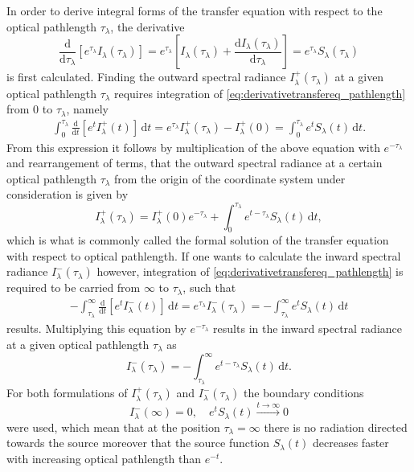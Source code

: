 \documentclass[a4paper,11pt]{report}
\def\lk#1{{\color{black}{#1}}}
\begin{document}
In order to derive integral forms of the transfer equation with respect to the optical pathlength $\tau_\lambda$, the derivative \begin{equation}\label{eq:derivativetransfereq_pathlength}
\frac{\mathrm{d}}{\mathrm{d}\tau_\lambda}\left[e^{\tau_\lambda}I_\lambda(\tau_\lambda)\right] = e^{\tau_\lambda}\left[I_\lambda(\tau_\lambda) + \frac{\mathrm{d}I_\lambda(\tau_\lambda)}{\mathrm{d}\tau_\lambda}\right] = e^{\tau_\lambda}S_\lambda(\tau_\lambda)
\end{equation} is first calculated. Finding the outward spectral radiance $I^+_\lambda(\tau_\lambda)$ at a given optical pathlength $\tau_\lambda$ requires integration of \cref{eq:derivativetransfereq_pathlength} from $0$ to $\tau_\lambda$, namely \begin{gather}
\int_{0}^{\tau_\lambda} \frac{\mathrm{d}}{\mathrm{d}t}\left[e^{t}I^+_\lambda(t)\right]\,\mathrm{d}t = e^{\tau_\lambda}I^+_\lambda(\tau_\lambda) - I^+_\lambda(0) = \int_{0}^{\tau_\lambda}e^t S_\lambda(t)\,\mathrm{d}t.
\end{gather} From this expression it follows by multiplication of the above equation with $e^{-\tau_\lambda}$ and rearrangement of terms, that the outward spectral radiance at a certain optical pathlength $\tau_\lambda$ from the origin of the coordinate system under consideration is given by \begin{equation}\label{eq:formaltransferequationoutward_pathlength}
I^+_\lambda(\tau_\lambda) = I^+_\lambda(0)e^{-\tau_\lambda} + \int_{0}^{\tau_\lambda} e^{t-\tau_\lambda}S_\lambda(t)\,\mathrm{d}t,
\end{equation} which is what is commonly called the formal solution of the transfer equation with respect to optical pathlength. If one wants to calculate the inward spectral radiance $I^-_\lambda(\tau_\lambda)$ however, integration of \cref{eq:derivativetransfereq_pathlength} is required to be carried \lk{out} from $\infty$ to $\tau_\lambda$, such that \begin{gather}
-\int_{\tau_\lambda}^{\infty} \frac{\mathrm{d}}{\mathrm{d}t}\left[e^{t}I^-_\lambda(t)\right]\,\mathrm{d}t = e^{\tau_\lambda}I_\lambda^-(\tau_\lambda) = -\int_{\tau_\lambda}^{\infty}e^t S_\lambda(t)\,\mathrm{d}t
\end{gather} results. Multiplying this equation by $e^{-\tau_\lambda}$ results in the inward spectral radiance at a given optical pathlength $\tau_\lambda$ \lk{calculated} as \begin{equation}\label{eq:formaltransferequationinward_pathlength}
I^-_\lambda(\tau_\lambda) = -\int_{\tau_\lambda}^{\infty}e^{t-\tau_\lambda}S_\lambda(t)\,\mathrm{d}t.
\end{equation} For both formulations of $I_\lambda^+(\tau_\lambda)$ and $I_\lambda^-(\tau_\lambda)$ the boundary conditions \begin{equation}
I_\lambda^-(\infty) = 0, \quad e^tS_\lambda(t) \xrightarrow{t\rightarrow \infty} 0
\end{equation} were used, which mean that at the position $\tau_\lambda = \infty$ there is no radiation directed towards the source \lk{and} moreover that the source function $S_\lambda(t)$ decreases faster with increasing optical pathlength than $e^{-t}$.
\end{document}
